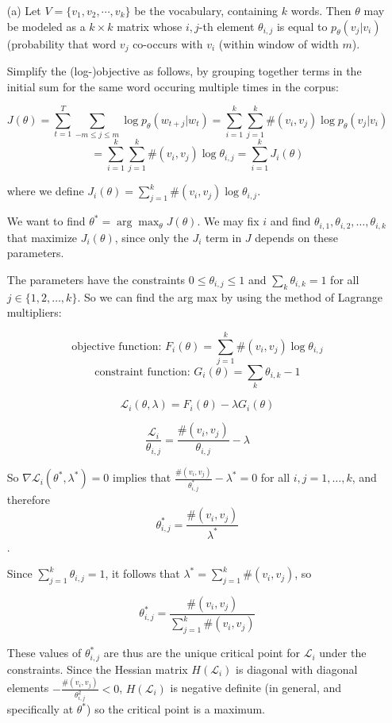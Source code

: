 \documentclass[12pt,letterpaper]{article}
\begin{document}
\begin{itemize}
    \item[(a)]
    Let $V = \{v_1, v_2, \cdots, v_k\}$ be the vocabulary, containing $k$ words. Then $\theta$ may be modeled as a $k \times k$ matrix whose $i,j$-th element $\theta_{i,j}$ is equal to $p_\theta(v_j | v_i)$ (probability that word $v_j$ co-occurs with $v_i$ (within window of width $m$).
    
    Simplify the (log-)objective as follows, by grouping together terms in the initial sum for the same word occuring multiple times in the corpus:
    
    $$J(\theta) = \sum_{t=1}^T \sum_{-m \leq j \leq m} \log p_\theta (w_{t+j} | w_t) = \sum_{i=1}^k \sum_{j=1}^k  \#(v_i, v_j) \log p_\theta (v_j | v_i)$$
    $$= \sum_{i=1}^k \sum_{j=1}^k  \#(v_i, v_j) \log \theta_{i, j} = \sum_{i=1}^k J_i(\theta)$$
    
    where we define $J_i(\theta) = \sum_{j=1}^k  \#(v_i, v_j) \log \theta_{i, j}$.
    
    We want to find $\theta^* = \arg \max_\theta J(\theta)$. We may fix $i$ and find $\theta_{i,1}, \theta_{i,2}, \ldots, \theta_{i, k}$ that maximize $J_i(\theta)$, since only the $J_i$ term in $J$ depends on these parameters.
    
    The parameters have the constraints $0 \leq \theta_{i, j} \leq 1$ and $\sum_k \theta_{i, k} = 1$ for all $j \in \{1, 2, \ldots, k\}$. So we can find the arg max by using the method of Lagrange multipliers:
    
    $$\text{objective function: } F_i(\theta) = \sum_{j=1}^k \#(v_i, v_j) \log \theta_{i,j}$$
    $$\text{constraint function: } G_i(\theta) = \sum_k \theta_{i, k} - 1$$
    
    $$\mathcal{L}_i(\theta, \lambda) = F_i(\theta) - \lambda G_i(\theta)$$
    
    $$\frac{\mathcal{L}_i}{\theta_{i, j}} = \frac{\#(v_i, v_j)}{\theta_{i, j}} - \lambda$$
    
    So $\nabla \mathcal{L}_i(\theta^*, \lambda^*) = 0$ implies that $\frac{\#(v_i, v_j)}{\theta^*_{i,j}} - \lambda^* = 0$ for all $i, j = 1, \ldots, k$, and therefore $$\theta^*_{i, j} = \frac{\#(v_i, v_j)}{\lambda^*}$$.
    
    Since $\sum_{j=1}^k \theta_{i, j} = 1$, it follows that $\lambda^* = \sum_{j=1}^k \#(v_i, v_j)$, so
    
    $$\theta^*_{i, j} = \frac{\#(v_i, v_j)}{\sum_{j=1}^k \#(v_i, v_j)}$$
    
    These values of $\theta^*_{i, j}$ are thus are the unique critical point for $\mathcal{L}_i$ under the constraints. Since the Hessian matrix $H(\mathcal{L}_i)$ is diagonal with diagonal elements $-\frac{\#(v_i, v_j)}{\theta_{i,j}^2} < 0$, $H(\mathcal{L}_i)$ is negative definite (in general, and specifically at $\theta^*$) so the critical point is a maximum.
    

\end{itemize}
\end{document}
